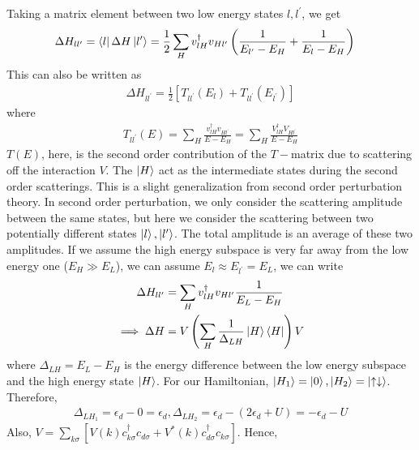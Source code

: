 Taking a matrix element between two low energy states \(l, l^\prime\), we get
\begin{equation}\begin{aligned}
	\Delta H_{ll^\prime} = \bra{l} \Delta H \ket{l^\prime} &= \frac{1}{2}\sum_H v^\dagger_{lH}v_{Hl^\prime}\left(\frac{1}{E_{l^\prime} - E_H}+\frac{1}{E_l - E_H}\right)
\end{aligned}\end{equation}
This can also be written as
\begin{equation}\begin{aligned}
	\label{hamtmat}
	\Delta H_{ll^\prime} = \frac{1}{2}\left[T_{ll^\prime}(E_l) + T_{ll^\prime}(E_{l^\prime})\right]
\end{aligned}\end{equation}
where 
\begin{equation}\begin{aligned}
T_{ll^\prime}(E) = \sum_H \frac{v^\dagger_{lH}v_{Hl^\prime}}{E-E_H} = \sum_H \frac{V^\dagger_{lH} V_{Hl^\prime}}{E-E_H}
\end{aligned}\end{equation}
\(T(E)\), here, is the second order contribution of the \(T-\)matrix due to scattering off the interaction \(V\).
The \(\ket{H}\) act as the intermediate states during the second order scatterings.
This is a slight generalization from second order perturbation theory.
In second order perturbation, we only consider the scattering amplitude between the same states, but here we consider the scattering between two potentially different states \(\ket{l},\ket{l^\prime}\).
The total amplitude is an average of these two amplitudes.
If we assume the high energy subspace is very far away from the low energy one (\(E_H \gg E_L\)), we can assume \(E_l \approx E_{l^\prime} = E_L\), we can write
\begin{equation}\begin{aligned}
\Delta H_{ll^\prime} &=\sum_H v^\dagger_{lH}v_{Hl^\prime}\frac{1}{E_L-E_H}\\
\implies \Delta H &=V \left(\sum_H \frac{1}{\Delta_{LH}}\ket{H}\bra{H}\right)V
\end{aligned}\end{equation}
where \(\Delta_{LH}=E_L - E_H\) is the energy difference between the low energy subspace and the high energy state \(\ket{H}\).
For our Hamiltonian, \(\ket{H_1} = \ket{0}, \ket{H_2} = \ket{\uparrow\downarrow}\).
Therefore,
\begin{equation}\begin{aligned}
	\Delta_{LH_1} = \epsilon_d - 0 = \epsilon_d, \Delta_{LH_2} = \epsilon_d - \left(2\epsilon_d + U\right) = -\epsilon_d - U
\end{aligned}\end{equation}
Also, \(V = \sum_{k\sigma}\left[V(k) c^\dagger_{k\sigma}c_{d\sigma} + V^*(k) c^\dagger_{d\sigma}c_{k\sigma}\right]\).
Hence,

